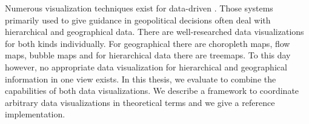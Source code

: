 Numerous visualization techniques exist for data-driven \dss{}.
Those systems primarily used to give guidance in geopolitical decisions often deal with hierarchical and geographical data.
There are well-researched data visualizations for both kinds individually.
For geographical there are choropleth maps, flow maps, bubble maps and for hierarchical data there are treemaps.
To this day however, no appropriate data visualization for hierarchical and geographical information in one view exists.
In this thesis, we evaluate \cmvs{} to combine the capabilities of both data visualizations.
We describe a framework to coordinate arbitrary data visualizations in theoretical terms and we give a reference implementation.

